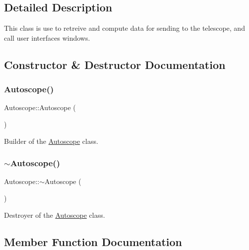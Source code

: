 \subsection{Detailed Description}
This class is use to retreive and compute data for sending to the telescope, and call user interfaces windows. 

\subsection{Constructor \& Destructor Documentation}
\mbox{\label{class_autoscope_a70213dc05856f7f6592d089d14f08f68}} 
\subsubsection{\texorpdfstring{Autoscope()}{Autoscope()}}
{\footnotesize\ttfamily Autoscope\+::\+Autoscope (\begin{DoxyParamCaption}{ }\end{DoxyParamCaption})}



Builder of the \mbox{\hyperlink{class_autoscope}{Autoscope}} class. 

\mbox{\label{class_autoscope_a8ed25b0eb945f3d2a2a3652322b14b42}} 
\subsubsection{\texorpdfstring{$\sim$Autoscope()}{~Autoscope()}}
{\footnotesize\ttfamily Autoscope\+::$\sim$\+Autoscope (\begin{DoxyParamCaption}{ }\end{DoxyParamCaption})\hspace{0.3cm}{\ttfamily [virtual]}}



Destroyer of the \mbox{\hyperlink{class_autoscope}{Autoscope}} class. 



\subsection{Member Function Documentation}
\mbox{\label{class_autoscope_a2bf2306aa6d3f37dadd83e6e00a35ff3}} 
